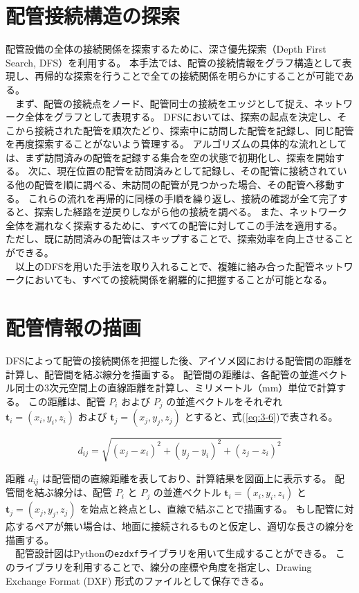 \section{配管接続構造の探索}
配管設備の全体の接続関係を探索するために、深さ優先探索（Depth First Search, DFS）を利用する。
本手法では、配管の接続情報をグラフ構造として表現し、再帰的な探索を行うことで全ての接続関係を明らかにすることが可能である。\\
　まず、配管の接続点をノード、配管同士の接続をエッジとして捉え、ネットワーク全体をグラフとして表現する。
DFSにおいては、探索の起点を決定し、そこから接続された配管を順次たどり、探索中に訪問した配管を記録し、同じ配管を再度探索することがないよう管理する。
アルゴリズムの具体的な流れとしては、まず訪問済みの配管を記録する集合を空の状態で初期化し、探索を開始する。
次に、現在位置の配管を訪問済みとして記録し、その配管に接続されている他の配管を順に調べる、未訪問の配管が見つかった場合、その配管へ移動する。
これらの流れを再帰的に同様の手順を繰り返し、接続の確認が全て完了すると、探索した経路を逆戻りしながら他の接続を調べる。
また、ネットワーク全体を漏れなく探索するために、すべての配管に対してこの手法を適用する。
ただし、既に訪問済みの配管はスキップすることで、探索効率を向上させることができる。\\
　以上のDFSを用いた手法を取り入れることで、複雑に絡み合った配管ネットワークにおいても、すべての接続関係を網羅的に把握することが可能となる。

\section{配管情報の描画}
DFSによって配管の接続関係を把握した後、アイソメ図における配管間の距離を計算し、配管間を結ぶ線分を描画する。
配管間の距離は、各配管の並進ベクトル同士の3次元空間上の直線距離を計算し、ミリメートル（mm）単位で計算する。
この距離は、配管 $P_i$ および $P_j$ の並進ベクトルをそれぞれ $\mathbf{t}_i = (x_i, y_i, z_i)$ および $\mathbf{t}_j = (x_j, y_j, z_j)$ とすると、式(\ref{eq:3-6})で表される。

\begin{equation}
d_{ij} = \sqrt{(x_j - x_i)^2 + (y_j - y_i)^2 + (z_j - z_i)^2}
\label{eq:3-6}
\end{equation}

距離 $d_{ij}$ は配管間の直線距離を表しており、計算結果を図面上に表示する。
配管間を結ぶ線分は、配管 $P_i$ と $P_j$ の並進ベクトル $\mathbf{t}_i = (x_i, y_i, z_i)$ と $\mathbf{t}_j = (x_j, y_j, z_j)$ を始点と終点とし、直線で結ぶことで描画する。
もし配管に対応するペアが無い場合は、地面に接続されるものと仮定し、適切な長さの線分を描画する。\\
　配管設計図はPythonの\texttt{ezdxf}ライブラリを用いて生成することができる。
このライブラリを利用することで、線分の座標や角度を指定し、Drawing Exchange Format (DXF) 形式のファイルとして保存できる。
